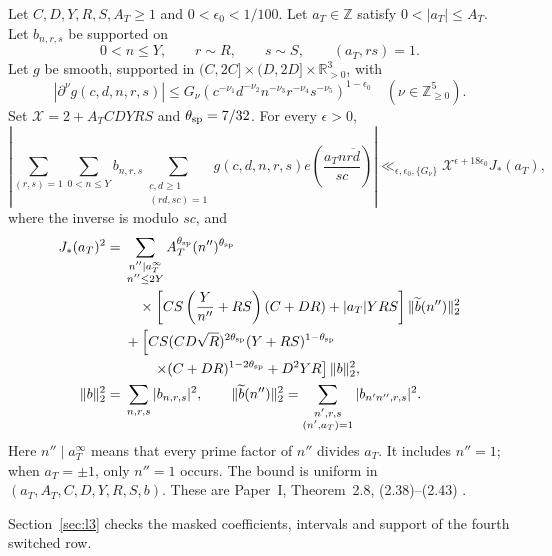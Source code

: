 \begin{fact}
Let $C,D,Y,R,S,A_T\ge1$ and $0<\epsilon_0<1/100$.
Let $a_T\in\mathbb Z$ satisfy $0<|a_T|\le A_T$.
Let $b_{n,r,s}$ be supported on
\begin{equation}\label{eq:t28-support}
 0<n\le Y,\qquad r\sim R,\qquad s\sim S,\qquad (a_T,rs)=1.
\end{equation}
Let $g$ be smooth, supported in
$(C,2C]\times(D,2D]\times\mathbb R_{>0}^3$, with
\begin{equation}\label{eq:t28-seminorms}
 |\partial^\nu g(c,d,n,r,s)|
 \le G_\nu(c^{-\nu_1}d^{-\nu_2}n^{-\nu_3}r^{-\nu_4}s^{-\nu_5})^{1-\epsilon_0}
 \quad(\nu\in\mathbb Z_{\ge0}^5).
\end{equation}
Set $\mathcal X=2+A_TCDYRS$ and $\theta_{\rm sp}=7/32$.
For every $\epsilon>0$,
\begin{equation}\label{eq:t28-conclusion}
 \left|\sum_{(r,s)=1}\sum_{0<n\le Y}b_{n,r,s}
 \sum_{\substack{c,d\ge1\\(rd,sc)=1}}
 g(c,d,n,r,s)e\left(\frac{a_T n\overline{rd}}{sc}\right)\right|
 \ll_{\epsilon,\epsilon_0,\{G_\nu\}}
       \mathcal X^{\epsilon+18\epsilon_0}J_*(a_T),
\end{equation}
where the inverse is modulo $sc$, and
\begin{equation}\label{eq:t28-main-bound}
 \begin{aligned}
 J_*(a_T)^2={}&\sum_{\substack{n''\mid a_T^\infty\\n''\le2Y}}
 A_T^{\theta_{\rm sp}}(n'')^{\theta_{\rm sp}}\\
 &\quad\times\left[CS\left(\frac Y{n''}+RS\right)(C+DR)+|a_T|YRS\right]
                 \|\widetilde b(n'')\|_2^2\\
 &+\left[CS(CD\sqrt R)^{2\theta_{\rm sp}}(Y+RS)^{1-\theta_{\rm sp}}\right.\\
 &\qquad\left.\times(C+DR)^{1-2\theta_{\rm sp}}+D^2YR\right]\|b\|_2^2,\\
 \|b\|_2^2={}&\sum_{n,r,s}|b_{n,r,s}|^2,\qquad
 \|\widetilde b(n'')\|_2^2=
       \sum_{\substack{n',r,s\\(n',a_T)=1}}|b_{n'n'',r,s}|^2.
 \end{aligned}
\end{equation}
Here $n''\mid a_T^\infty$ means that every prime factor of $n''$ divides $a_T$.
It includes $n''=1$; when $a_T=\pm1$, only $n''=1$ occurs.
The bound is uniform in $(a_T,A_T,C,D,Y,R,S,b)$.
These are Paper~I, Theorem~2.8, (2.38)--(2.43)
\cite[Theorem~2.8, (2.38)--(2.43), pp.~14--15]{PaperI}.
\end{fact}

Section~\ref{sec:l3} checks the masked coefficients, intervals and support
of the fourth switched row.

